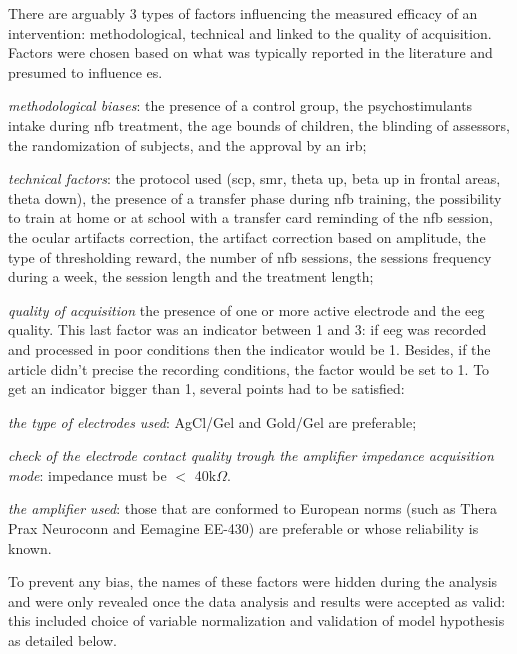 There are arguably 3 types of factors influencing the measured efficacy of an intervention: methodological, technical and linked to the quality of acquisition.
Factors were chosen based on what was typically reported in the literature and presumed to influence \gls{es}.
\begin{description}
\item \textit{methodological biases}: the presence of a control group, the psychostimulants intake during \gls{nfb} treatment, the age bounds of children, the blinding of assessors, 
the randomization of subjects, and the approval by an \gls{irb};
\item \textit{technical factors}: the protocol used (\gls{scp}, \gls{smr}, 
theta up, beta up in frontal areas, theta down), the presence of a transfer phase during \gls{nfb} training, the possibility to train at home 
or at school with a transfer card reminding of the \gls{nfb} session, the ocular artifacts correction, the artifact correction based on amplitude, 
the type of thresholding reward, the number of \gls{nfb} sessions, the sessions frequency during a week, the session length and the treatment length;
\item \textit{quality of acquisition} the presence of one or more active electrode and the \gls{eeg} quality. 
This last factor was an indicator between 1 and 3: if \gls{eeg} was recorded and processed in poor conditions then the indicator would be 1. 
Besides, if the article didn't precise the recording conditions, the factor would be set to 1. To get an indicator bigger than 1, several 
points had to be satisfied:
\begin{description}
\item \textit{the type of electrodes used}: AgCl/Gel and Gold/Gel are preferable;
\item \textit{check of the electrode contact quality trough the amplifier impedance acquisition mode}: impedance must be $<$ 40k$\Omega$.  
\item \textit{the amplifier used}: those that are conformed to European norms (such as Thera Prax \textregistered 
Neuroconn and Eemagine EE-430) are preferable or whose reliability is known.
\end{description}
\end{description}

To prevent any bias, the names of these factors were hidden during the analysis and were only revealed once the data 
analysis and results were accepted as valid: this included choice of variable
normalization and validation of model hypothesis as detailed below.

